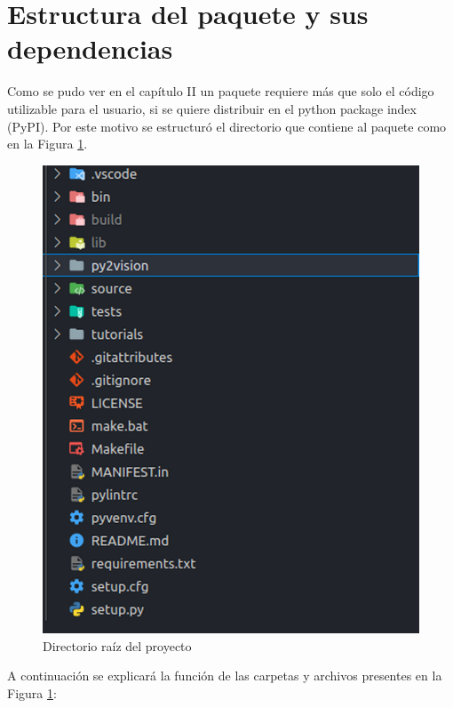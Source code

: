 \section{Estructura del paquete y sus dependencias}
Como se pudo ver en el capítulo II un paquete requiere más que solo el código utilizable para el usuario, si se quiere distribuir en el python package index (PyPI). Por este motivo se estructuró el directorio que contiene al paquete como en la Figura \ref{directorioCompletoPaquete}. 
\begin{figure}[H]
    \centering
    \includegraphics[scale=0.3]{Recursos/directoriosPaqueteNivelRoot.png}
    \caption{Directorio raíz del proyecto}
    \label{directorioCompletoPaquete}
\end{figure}
A continuación se explicará la función de las carpetas y archivos presentes en la Figura \ref{directorioCompletoPaquete}:
